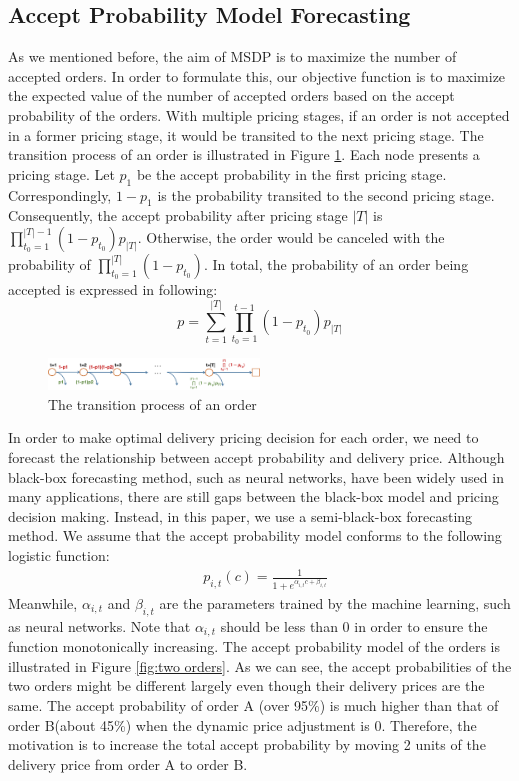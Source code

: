 \documentclass[sigconf,authordraft]{acmart}
\begin{document}
\subsection{Accept Probability Model Forecasting}\label{sec:pro-model}
 As we mentioned before, the aim of MSDP is to maximize the number of accepted orders. In order to formulate this, our objective function is to maximize the expected value of the number of accepted orders based on the accept probability of the orders. With multiple pricing stages, if an order is not accepted in a former pricing stage, it would be transited to the next pricing stage. The transition process of an order is illustrated in Figure \ref{fig:ordertran}. Each node presents a pricing stage. Let $p_1$ be the accept probability in the first pricing stage. Correspondingly, $1-p_1$ is the probability transited to the second pricing stage. Consequently, the accept probability after pricing stage $|T|$ is $\prod_{t_0=1}^{|T|-1}(1-p_{t_0})p_{|T|}$. Otherwise, the order would be canceled with the probability of $\prod_{t_0=1}^{|T|}(1-p_{t_0})$. In total, the probability of an order being accepted is expressed in following:
\begin{equation}
    p=\sum_{t=1}^{|T|}\prod_{t_0=1}^{t-1}(1-p_{t_0})p_{|T|}
\end{equation}
\begin{figure}[h]
  \centering
  \includegraphics[width=0.5\textwidth]{transit.png}
  \caption{The transition process of an order}
  \label{fig:ordertran}
\end{figure}
In order to make optimal delivery pricing decision for each order, we need to forecast the relationship between accept probability and delivery price. Although black-box forecasting method, such as neural networks, have been widely used in many applications, there are still gaps between the black-box model and pricing decision making. Instead, in this paper, we use a semi-black-box forecasting method. We assume that the accept probability model conforms to the following logistic function:
\begin{align}
    \label{eq1.4} & p_{i,t}(c)=\frac{1}{1+e^{\alpha_{i,t} c+\beta_{i,t}}}
\end{align}
Meanwhile, $\alpha_{i,t}$ and $\beta_{i,t}$ are the parameters trained by the machine learning, such as neural networks. Note that $\alpha_{i,t}$ should be less than 0 in order to ensure the function monotonically increasing. The accept probability model of the orders is illustrated in Figure \ref{fig:two orders}. As we can see, the accept probabilities of the two orders might be different largely even though their delivery prices are the same. The accept probability of order A (over 95\%) is much higher than that of order B(about 45\%) when the dynamic price adjustment is 0. Therefore, the motivation is to increase the total accept probability by moving 2 units of the delivery price from order A to order B.
\end{document}
